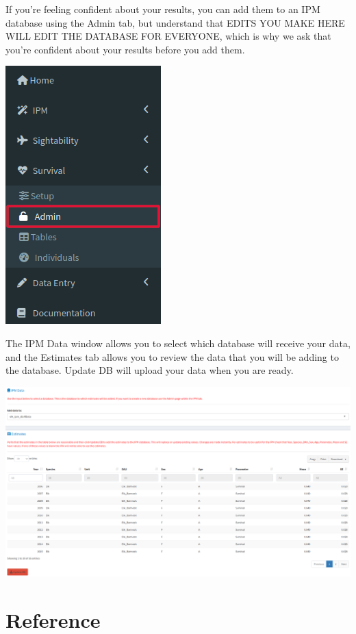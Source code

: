 \documentclass[
]{book}
\begin{document}
If you're feeling confident about your results, you can add them to an IPM database using the Admin tab, but understand that EDITS YOU MAKE HERE WILL EDIT THE DATABASE FOR EVERYONE, which is why we ask that you're confident about your results before you add them.

\includegraphics{./www/surv_walk10.png}

The IPM Data window allows you to select which database will receive your data, and the Estimates tab allows you to review the data that you will be adding to the database. {Update DB} will upload your data when you are ready.

\includegraphics{./www/surv_walk11.png}

\hypertarget{surv-ref}{%
\section{Reference}\label{surv-ref}}
\end{document}
